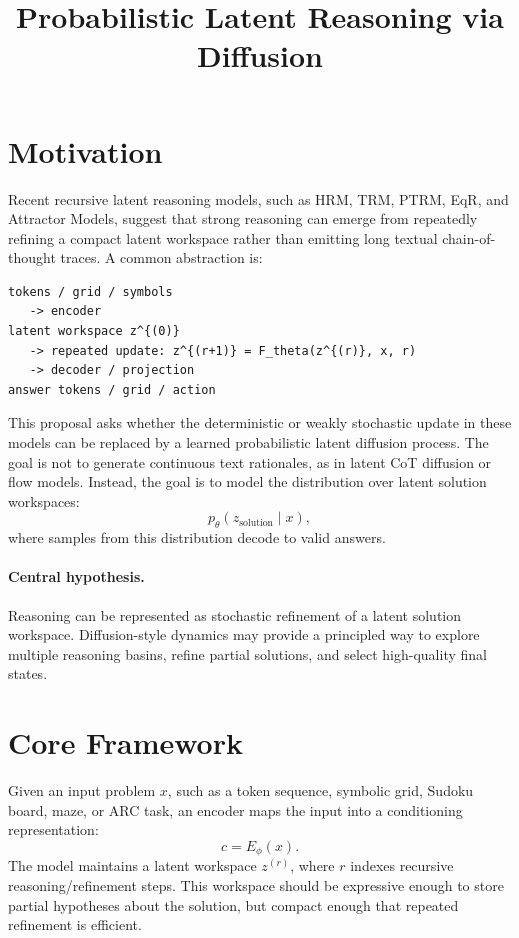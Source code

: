 \documentclass[11pt]{article}
\title{\textbf{Probabilistic Latent Reasoning via Diffusion}}
\author{}
\date{}
\begin{document}
\maketitle

\section{Motivation}

Recent recursive latent reasoning models, such as HRM, TRM, PTRM, EqR, and Attractor Models, suggest that strong reasoning can emerge from repeatedly refining a compact latent workspace rather than emitting long textual chain-of-thought traces. A common abstraction is:

\begin{lstlisting}
tokens / grid / symbols
   -> encoder
latent workspace z^{(0)}
   -> repeated update: z^{(r+1)} = F_theta(z^{(r)}, x, r)
   -> decoder / projection
answer tokens / grid / action
\end{lstlisting}

This proposal asks whether the deterministic or weakly stochastic update in these models can be replaced by a learned probabilistic latent diffusion process. The goal is not to generate continuous text rationales, as in latent CoT diffusion or flow models. Instead, the goal is to model the distribution over latent solution workspaces:
\[
    p_\theta(z_{\mathrm{solution}}\mid x),
\]
where samples from this distribution decode to valid answers.

\paragraph{Central hypothesis.}
Reasoning can be represented as stochastic refinement of a latent solution workspace. Diffusion-style dynamics may provide a principled way to explore multiple reasoning basins, refine partial solutions, and select high-quality final states.

\section{Core Framework}

Given an input problem \(x\), such as a token sequence, symbolic grid, Sudoku board, maze, or ARC task, an encoder maps the input into a conditioning representation:
\[
    c = E_\phi(x).
\]
The model maintains a latent workspace \(z^{(r)}\), where \(r\) indexes recursive reasoning/refinement steps. This workspace should be expressive enough to store partial hypotheses about the solution, but compact enough that repeated refinement is efficient.
\end{document}

